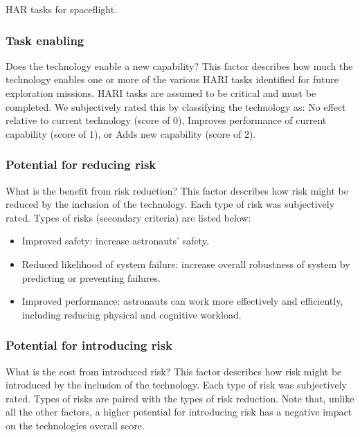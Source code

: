 \begin{table}[tb]
    \centering
    \caption[HAR tasks for spaceflight]{HAR tasks for spaceflight.}
    \label{table:har-tasks}
\end{table}

\subsubsection{Task enabling}
Does the technology enable a new capability? This factor describes how much the technology enables one or more of the various HARI tasks identified for future exploration missions.
HARI tasks are assumed to be critical and must be completed.
We subjectively rated this by classifying the technology as: No effect relative to current technology (score of 0), Improves performance of current capability (score of 1), or Adds new capability (score of 2).

\subsubsection{Potential for reducing risk}
What is the benefit from risk reduction? This factor describes how risk might be reduced by the inclusion of the technology.
Each type of risk was subjectively rated.
Types of risks (secondary criteria) are listed below:
\begin{itemize}
    \item Improved safety: increase astronauts' safety.
    \item Reduced likelihood of system failure: increase overall robustness of system by predicting or preventing failures.
    \item Improved performance: astronauts can work more effectively and efficiently, including reducing physical and cognitive workload.
\end{itemize}

\subsubsection{Potential for introducing risk}
What is the cost from introduced risk? This factor describes how risk might be introduced by the inclusion of the technology.
Each type of risk was subjectively rated.
Types of risks are paired with the types of risk reduction.
Note that, unlike all the other factors, a higher potential for introducing risk has a negative impact on the technologies overall score.

